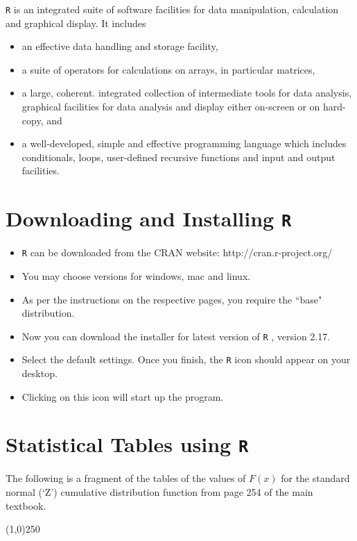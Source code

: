 \texttt{R} is an integrated suite of software facilities for data manipulation, calculation and graphical display. It
includes
\begin{itemize}
	\item an effective data handling and storage facility,
	\item a suite of operators for calculations on arrays, in particular matrices,
	\item a large, coherent. integrated collection of intermediate tools for data analysis,
	graphical facilities for data analysis and display either on-screen or on hard-copy, and
	\item a well-developed, simple and effective programming language which includes conditionals, loops,
	user-defined recursive functions and input and output facilities.
\end{itemize}

\section{Downloading and Installing \texttt{R}}

\begin{itemize}
	\item \texttt{R} can be downloaded from the CRAN website: http://cran.r-project.org/
	\item You may choose versions for windows, mac and linux.
	\item As per the instructions on the respective pages, you require the ``base" distribution.
	\item Now you can download the installer for latest version of \texttt{R} , version 2.17.
	\item Select the default settings. Once you finish, the \texttt{R} icon should appear on your desktop.
	\item Clicking on this icon will start up the program.
\end{itemize}

\section{Statistical Tables using \texttt{R}}
The following is a fragment of the tables of the values of $F(x)$ for the standard normal (`Z') cumulative distribution function from page 254 of the main textbook.

\newpage
\begin{center}
	\line(1,0){250}
\end{center}

